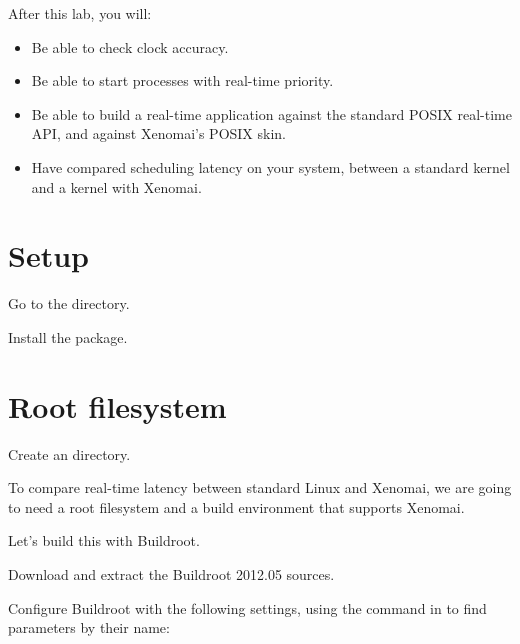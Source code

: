 
After this lab, you will:
\begin{itemize}
\item Be able to check clock accuracy.
\item Be able to start processes with real-time priority.
\item Be able to build a real-time application against the standard
POSIX real-time API, and against Xenomai's POSIX skin.
\item Have compared scheduling latency on your system, between a standard kernel and a kernel with Xenomai.
\end{itemize}

\section{Setup}

Go to the  directory.

Install the  package.

\section{Root filesystem}

Create an  directory.

To compare real-time latency between standard Linux and Xenomai, we
are going to need a root filesystem and a build environment that
supports Xenomai.

Let's build this with Buildroot.

Download and extract the Buildroot 2012.05 sources.

Configure Buildroot with the following settings, using the \code{/}
command in  to find parameters by their name:

